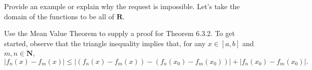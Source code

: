 \begin{solution}
  \TODO
\end{solution}
\begin{exercise}
  Provide an example or explain why the request is impossible. Let's take the domain of the functions to be all of $\mathbf{R}$.
\end{exercise}
\begin{solution}
  \TODO
\end{solution}
\begin{exercise}
  Use the Mean Value Theorem to supply a proof for Theorem 6.3.2. To get started, observe that the triangle inequality implies that, for any $x \in[a, b]$ and $m, n \in \mathbf{N}$,
  $$
  \left|f_{n}(x)-f_{m}(x)\right| \leq\left|\left(f_{n}(x)-f_{m}(x)\right)-\left(f_{n}\left(x_{0}\right)-f_{m}\left(x_{0}\right)\right)\right|+\left|f_{n}\left(x_{0}\right)-f_{m}\left(x_{0}\right)\right| .
  $$
\end{exercise}
\begin{solution}
  \TODO
\end{solution}
